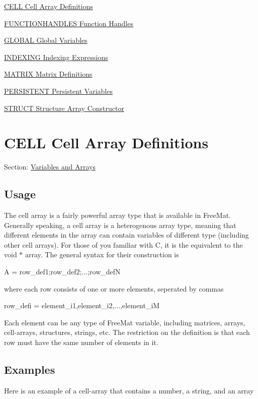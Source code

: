 
\begin{DoxyItemize}
\item \hyperlink{variables_cell}{C\-E\-L\-L Cell Array Definitions}  
\item \hyperlink{variables_functionhandles}{F\-U\-N\-C\-T\-I\-O\-N\-H\-A\-N\-D\-L\-E\-S Function Handles}  
\item \hyperlink{variables_global}{G\-L\-O\-B\-A\-L Global Variables}  
\item \hyperlink{variables_indexing}{I\-N\-D\-E\-X\-I\-N\-G Indexing Expressions}  
\item \hyperlink{variables_matrix}{M\-A\-T\-R\-I\-X Matrix Definitions}  
\item \hyperlink{variables_persistent}{P\-E\-R\-S\-I\-S\-T\-E\-N\-T Persistent Variables}  
\item \hyperlink{variables_struct}{S\-T\-R\-U\-C\-T Structure Array Constructor}  
\end{DoxyItemize}\hypertarget{variables_cell}{}\section{C\-E\-L\-L Cell Array Definitions}\label{variables_cell}
Section\-: \hyperlink{sec_variables}{Variables and Arrays} \hypertarget{vtkwidgets_vtkxyplotwidget_Usage}{}\subsection{Usage}\label{vtkwidgets_vtkxyplotwidget_Usage}
The cell array is a fairly powerful array type that is available in Free\-Mat. Generally speaking, a cell array is a heterogenous array type, meaning that different elements in the array can contain variables of different type (including other cell arrays). For those of you familiar with {\ttfamily C}, it is the equivalent to the {\ttfamily void $\ast$} array. The general syntax for their construction is \begin{DoxyVerb}   A = {row_def1;row_def2;...;row_defN}
\end{DoxyVerb}
 where each row consists of one or more elements, seperated by commas \begin{DoxyVerb}  row_defi = element_i1,element_i2,...,element_iM
\end{DoxyVerb}
 Each element can be any type of Free\-Mat variable, including matrices, arrays, cell-\/arrays, structures, strings, etc. The restriction on the definition is that each row must have the same number of elements in it. \hypertarget{variables_matrix_Examples}{}\subsection{Examples}\label{variables_matrix_Examples}
Here is an example of a cell-\/array that contains a number, a string, and an array


